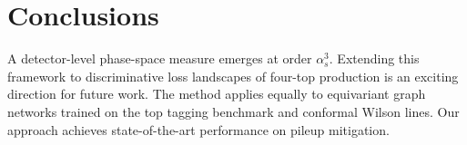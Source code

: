 \section{Conclusions}\label{sec:conclusions}

A detector-level phase-space measure emerges at order $\alpha_s^3$.
Extending this framework to discriminative loss landscapes of four-top
production is an exciting direction for future work. The method applies
equally to equivariant graph networks trained on the top tagging
benchmark and conformal Wilson lines. Our approach achieves
state-of-the-art performance on pileup mitigation.

